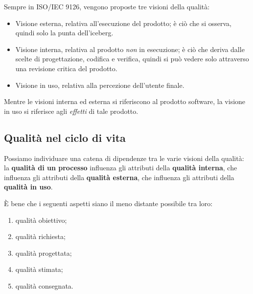 \documentclass[a4paper]{article}
\begin{document}
		
Sempre in ISO/IEC 9126, vengono proposte tre visioni della qualità:
		
	\begin{itemize}
		
			
	\item Visione esterna, relativa all'esecuzione del prodotto; è ciò che si osserva, quindi solo la punta dell'iceberg.
			
	\item Visione interna, relativa al prodotto \emph{non} in esecuzione; è ciò che deriva dalle scelte di progettazione, codifica e verifica, quindi si può vedere solo attraverso una revisione critica del prodotto.
			
	\item Visione in uso, relativa alla percezione dell'utente finale.
		
	\end{itemize}

		
Mentre le visioni interna ed esterna si riferiscono al prodotto software, la visione in uso si riferisce agli \emph{effetti} di tale prodotto.

		
	\subsection{Qualità nel ciclo di vita}

		
Possiamo individuare una catena di dipendenze tra le varie visioni della qualità: la \textbf{qualità di un processo} influenza gli attributi della \textbf{qualità interna}, che influenza gli attributi della \textbf{qualità esterna}, che influenza gli attributi della \textbf{qualità in uso}.
		
È bene che i seguenti aspetti siano il meno distante possibile tra loro:
		
	\begin{enumerate}
		
			
	\item qualità obiettivo;
			
	\item qualità richiesta;
			
	\item qualità progettata;
			
	\item qualità stimata;
			
	\item qualità consegnata.
		
	\end{enumerate}
\end{document}
